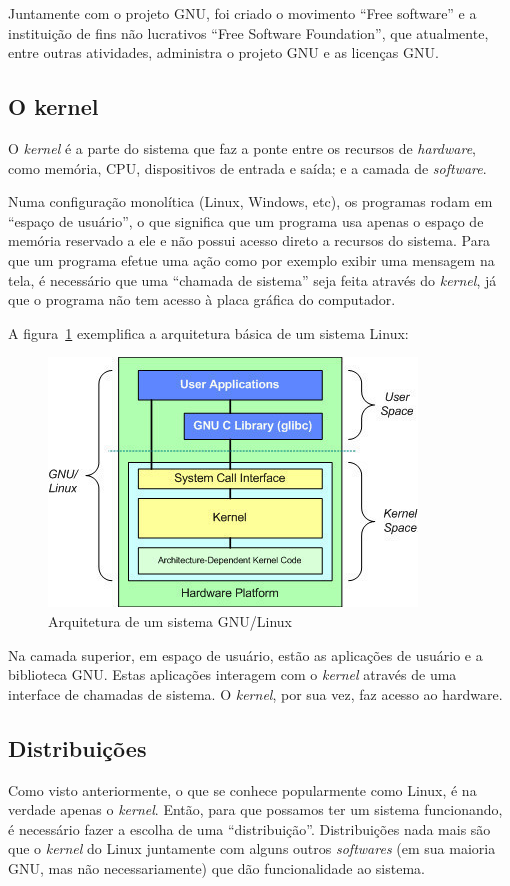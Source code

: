 \documentclass{handout_utfpr}
\begin{document}
Juntamente com o projeto GNU, foi criado o movimento ``Free software'' e a instituição de fins não lucrativos ``Free Software Foundation'', que atualmente, entre outras atividades, administra o projeto GNU e as licenças GNU.

\subsection{O kernel}\label{kernel}
O \textit{kernel} é a parte do sistema que faz a ponte entre os recursos de \textit{hardware}, como memória, CPU, dispositivos de entrada e saída; e a camada de \textit{software}.

Numa configuração monolítica (Linux, Windows, etc), os programas rodam em ``espaço de usuário'', o que significa que um programa usa apenas o espaço de memória reservado a ele e não possui acesso direto a recursos do sistema. Para que um programa efetue uma ação como por exemplo exibir uma mensagem na tela, é necessário que uma ``chamada de sistema'' seja feita através do \textit{kernel}, já que o programa não tem acesso à placa gráfica do computador.

A figura~\ref{fig:kernel} exemplifica a arquitetura básica de um sistema Linux:
\begin{figure}[!h]
  \centering
  \includegraphics[]{imagens/kernel.jpg}
  \caption{Arquitetura de um sistema GNU/Linux}
  \label{fig:kernel}
\end{figure}
Na camada superior, em espaço de usuário, estão as aplicações de usuário e a biblioteca GNU\@. Estas aplicações interagem com o \textit{kernel} através de uma interface de chamadas de sistema. O \textit{kernel}, por sua vez, faz acesso ao hardware.

\subsection{Distribuições}\label{distro}
Como visto anteriormente, o que se conhece popularmente como Linux, é na verdade apenas o \textit{kernel}. Então, para que possamos ter um sistema funcionando, é necessário fazer a escolha de uma ``distribuição''. Distribuições nada mais são que o \textit{kernel} do Linux juntamente com alguns outros \textit{softwares} (em sua maioria GNU, mas não necessariamente) que dão funcionalidade ao sistema.
\end{document}
